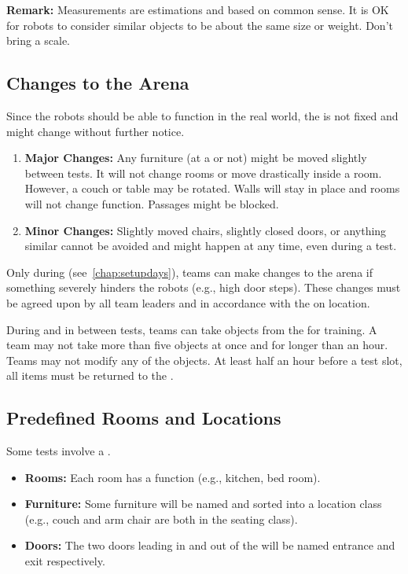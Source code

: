 \noindent\textbf{Remark:} Measurements are estimations and based on common sense. It is OK for robots to consider similar objects to be about the same size or weight. Don't bring a scale.


\subsection{Changes to the Arena}
\label{sec:rules:scenario:changes}
Since the robots should be able to function in the real world, the \Arena{} is not fixed and might change without further notice.
\begin{enumerate}
	\item \textbf{Major Changes:}
	Any furniture (at a \PredefinedLocation{} or not) might be moved slightly between tests. It will not change rooms or move drastically inside a room. However, a couch or table may be rotated. Walls will stay in place and rooms will not change function. Passages might be blocked.
	
	\item \textbf{Minor Changes:} Slightly moved chairs, slightly closed doors, or anything similar cannot be avoided and might happen at any time, even during a test.
\end{enumerate}

\noindent Only during \SetupDays{} (see~\ref{chap:setupdays}), teams can make changes to the arena if something severely hinders the robots (e.g., high door steps). These changes must be agreed upon by all team leaders and in accordance with the \TC{} on location.

During \SetupDays{} and in between tests, teams can take objects from the \Arena{} for training. A team may not take more than five objects at once and for longer than an hour. Teams may not modify any of the objects. At least half an hour before a test slot, all items must be returned to the \Arena{}.


\subsection{Predefined Rooms and Locations}
\textit{\label{sec:rules:scenario:locations}}
Some tests involve a \PredefinedLocation{}.
\begin{itemize}
	\item \textbf{Rooms:} Each room has a function (e.g., kitchen, bed room).
	
	\item \textbf{Furniture:} Some furniture will be named and sorted into a location class (e.g., couch and arm chair are both in the seating class). 
	
	\item \textbf{Doors:} The two doors leading in and out of the \Arena{} will be named entrance and exit respectively.
\end{itemize}



